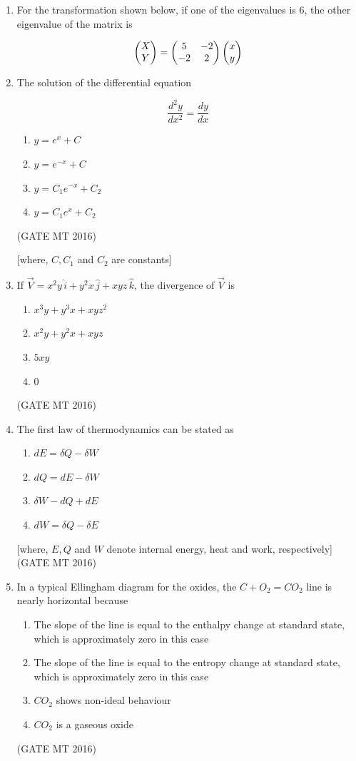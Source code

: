 \documentclass[11pt, letterpaper]{article}
\theoremstyle{remark}
\begin{document}
\begin{enumerate}

\item For the transformation shown below, if one of the eigenvalues is 6, the other eigenvalue of the matrix is

$$\begin{pmatrix}X \\ Y\end{pmatrix} =
\begin{pmatrix}5 & -2 \\ -2 & 2\end{pmatrix}
\begin{pmatrix}x \\ y\end{pmatrix}$$


\item The solution of the differential equation

$$\frac{d^2 y}{dx^2} = \frac{dy}{dx}$$

\begin{multicols}{2}
\begin{enumerate}
\item $y = e^x + C$
\item $y = e^{-x} + C$
\item $y = C_1 e^{-x} + C_2$
\item $y = C_1 e^x + C_2$
\end{enumerate}   
\end{multicols}
\hfill(GATE MT 2016)

[where, $C, C_1$ and $C_2$ are constants]

\item If $\vec{V} = x^2 y \, \hat{i} + y^2 x \, \hat{j} + xyz \, \hat{k}$, the divergence of $\vec{V}$ is
\begin{enumerate}
\item $x^3 y + y^3 x + xyz^2$
\item $x^2 y + y^2 x + xyz$
\item $5xy$
\item $0$
\end{enumerate}
\hfill(GATE MT 2016)

\item The first law of thermodynamics can be stated as
\begin{enumerate}
\item $dE = \delta Q - \delta W$
\item $dQ = dE - \delta W$
\item $\delta W - dQ + dE$
\item $dW = \delta Q - \delta E$
\end{enumerate}
[where, $E, Q$ and $W$ denote internal energy, heat and work, respectively]
\hfill(GATE MT 2016)

\item In a typical Ellingham diagram for the oxides, the $C + O_2 = CO_2$ line is nearly horizontal because
\begin{enumerate}
\item The slope of the line is equal to the enthalpy change at standard state, which is approximately zero in this case
\item The slope of the line is equal to the entropy change at standard state, which is approximately zero in this case
\item $CO_2$ shows non-ideal behaviour
\item $CO_2$ is a gaseous oxide
\end{enumerate}
\hfill(GATE MT 2016)


\end{enumerate}
\end{document}
